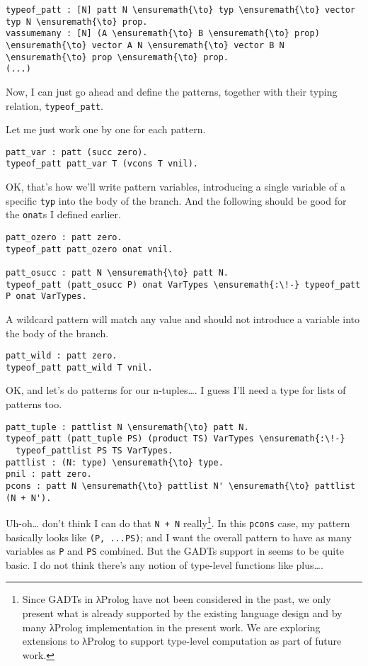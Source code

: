 \begin{verbatim}
typeof_patt : [N] patt N \ensuremath{\to} typ \ensuremath{\to} vector typ N \ensuremath{\to} prop.
vassumemany : [N] (A \ensuremath{\to} B \ensuremath{\to} prop) \ensuremath{\to} vector A N \ensuremath{\to} vector B N \ensuremath{\to} prop \ensuremath{\to} prop.
(...)
\end{verbatim}

Now, I can just go ahead and define the patterns, together with their
typing relation, \texttt{typeof\_patt}.

Let me just work one by one for each pattern.

\begin{verbatim}
patt_var : patt (succ zero).
typeof_patt patt_var T (vcons T vnil).
\end{verbatim}

OK, that's how we'll write pattern variables, introducing a single
variable of a specific \texttt{typ} into the body of the branch. And the
following should be good for the \texttt{onat}s I defined earlier.

\begin{verbatim}
patt_ozero : patt zero.
typeof_patt patt_ozero onat vnil.

patt_osucc : patt N \ensuremath{\to} patt N.
typeof_patt (patt_osucc P) onat VarTypes \ensuremath{:\!-} typeof_patt P onat VarTypes.
\end{verbatim}

A wildcard pattern will match any value and should not introduce a
variable into the body of the branch.

\begin{verbatim}
patt_wild : patt zero.
typeof_patt patt_wild T vnil.
\end{verbatim}

OK, and let's do patterns for our n-tuples\ldots{}. I guess I'll need a
type for lists of patterns too.

\begin{verbatim}
patt_tuple : pattlist N \ensuremath{\to} patt N.
typeof_patt (patt_tuple PS) (product TS) VarTypes \ensuremath{:\!-}
  typeof_pattlist PS TS VarTypes.
pattlist : (N: type) \ensuremath{\to} type.
pnil : patt zero.
pcons : patt N \ensuremath{\to} pattlist N' \ensuremath{\to} pattlist (N + N').
\end{verbatim}

Uh-oh\ldots{} don't think I can do that
\texttt{N\ +\ N\textquotesingle{}}
really\footnote{Since GADTs in \foreignlanguage{greek}{λ}Prolog have not been considered in the past, we only present what is already supported by the existing language design and by many \foreignlanguage{greek}{λ}Prolog implementation in the present work. We are exploring extensions to \foreignlanguage{greek}{λ}Prolog to support type-level computation as part of future work.}.
In this \texttt{pcons} case, my pattern basically looks like
\texttt{(P,\ ...PS)}; and I want the overall pattern to have as many
variables as \texttt{P} and \texttt{PS} combined. But the GADTs support
in \lamprolog seems to be quite basic. I do not think there's any notion
of type-level functions like plus\ldots{}.

